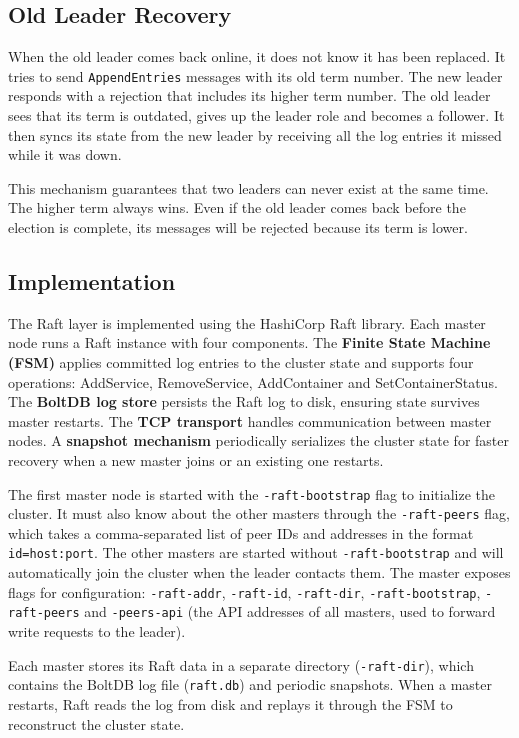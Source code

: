 \subsection{Old Leader Recovery}

When the old leader comes back online, it does not know it has been replaced. It tries to send \texttt{AppendEntries} messages with its old term number. The new leader responds with a rejection that includes its higher term number. The old leader sees that its term is outdated, gives up the leader role and becomes a follower. It then syncs its state from the new leader by receiving all the log entries it missed while it was down.

This mechanism guarantees that two leaders can never exist at the same time. The higher term always wins. Even if the old leader comes back before the election is complete, its messages will be rejected because its term is lower.

\subsection{Implementation}

The Raft layer is implemented using the HashiCorp Raft library. Each master node runs a Raft instance with four components. The \textbf{Finite State Machine (FSM)} applies committed log entries to the cluster state and supports four operations: AddService, RemoveService, AddContainer and SetContainerStatus. The \textbf{BoltDB log store} persists the Raft log to disk, ensuring state survives master restarts. The \textbf{TCP transport} handles communication between master nodes. A \textbf{snapshot mechanism} periodically serializes the cluster state for faster recovery when a new master joins or an existing one restarts.

The first master node is started with the \texttt{-raft-bootstrap} flag to initialize the cluster. It must also know about the other masters through the \texttt{-raft-peers} flag, which takes a comma-separated list of peer IDs and addresses in the format \texttt{id=host:port}. The other masters are started without \texttt{-raft-bootstrap} and will automatically join the cluster when the leader contacts them. The master exposes flags for configuration: \texttt{-raft-addr}, \texttt{-raft-id}, \texttt{-raft-dir}, \texttt{-raft-bootstrap}, \texttt{-raft-peers} and \texttt{-peers-api} (the API addresses of all masters, used to forward write requests to the leader).

Each master stores its Raft data in a separate directory (\texttt{-raft-dir}), which contains the BoltDB log file (\texttt{raft.db}) and periodic snapshots. When a master restarts, Raft reads the log from disk and replays it through the FSM to reconstruct the cluster state.

